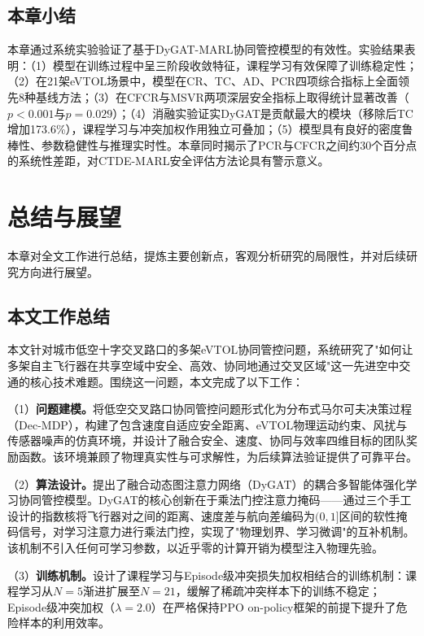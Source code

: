 \documentclass[12pt,a4paper,UTF8]{ctexbook}
\begin{document}
\section{本章小结}

本章通过系统实验验证了基于DyGAT-MARL协同管控模型的有效性。实验结果表明：（1）模型在训练过程中呈三阶段收敛特征，课程学习有效保障了训练稳定性；（2）在21架eVTOL场景中，模型在CR、TC、AD、PCR四项综合指标上全面领先8种基线方法；（3）在CFCR与MSVR两项深层安全指标上取得统计显著改善（$p<0.001$与$p=0.029$）；（4）消融实验证实DyGAT是贡献最大的模块（移除后TC增加173.6\%），课程学习与冲突加权作用独立可叠加；（5）模型具有良好的密度鲁棒性、参数稳健性与推理实时性。本章同时揭示了PCR与CFCR之间约30个百分点的系统性差距，对CTDE-MARL安全评估方法论具有警示意义。

\chapter{总结与展望}

本章对全文工作进行总结，提炼主要创新点，客观分析研究的局限性，并对后续研究方向进行展望。

\section{本文工作总结}

本文针对城市低空十字交叉路口的多架eVTOL协同管控问题，系统研究了"如何让多架自主飞行器在共享空域中安全、高效、协同地通过交叉区域"这一先进空中交通的核心技术难题。围绕这一问题，本文完成了以下工作：

（1）\textbf{问题建模。}将低空交叉路口协同管控问题形式化为分布式马尔可夫决策过程（Dec-MDP），构建了包含速度自适应安全距离、eVTOL物理运动约束、风扰与传感器噪声的仿真环境，并设计了融合安全、速度、协同与效率四维目标的团队奖励函数。该环境兼顾了物理真实性与可求解性，为后续算法验证提供了可靠平台。

（2）\textbf{算法设计。}提出了融合动态图注意力网络（DyGAT）的耦合多智能体强化学习协同管控模型。DyGAT的核心创新在于乘法门控注意力掩码——通过三个手工设计的指数核将飞行器对之间的距离、速度差与航向差编码为$(0,1]$区间的软性掩码信号，对学习注意力进行乘法门控，实现了"物理划界、学习微调"的互补机制。该机制不引入任何可学习参数，以近乎零的计算开销为模型注入物理先验。

（3）\textbf{训练机制。}设计了课程学习与Episode级冲突损失加权相结合的训练机制：课程学习从$N=5$渐进扩展至$N=21$，缓解了稀疏冲突样本下的训练不稳定；Episode级冲突加权（$\lambda=2.0$）在严格保持PPO on-policy框架的前提下提升了危险样本的利用效率。
\end{document}
